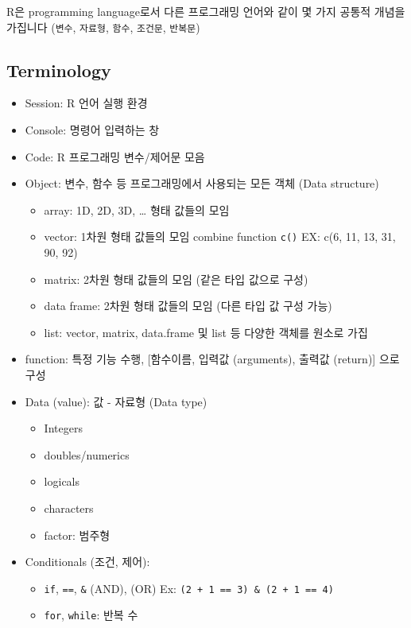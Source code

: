 \documentclass[
]{book}
\providecommand{\tightlist}{%
  \setlength{\itemsep}{0pt}\setlength{\parskip}{0pt}}
\begin{document}
R은 programming language로서 다른 프로그래밍 언어와 같이 몇 가지 공통적 개념을 가집니다 (\texttt{변수}, \texttt{자료형}, \texttt{함수}, \texttt{조건문}, \texttt{반복문})

\hypertarget{terminology}{%
\subsection{Terminology}\label{terminology}}

\begin{itemize}
\tightlist
\item
  Session: R 언어 실행 환경
\item
  Console: 명령어 입력하는 창
\item
  Code: R 프로그래밍 변수/제어문 모음
\item
  Object: 변수, 함수 등 프로그래밍에서 사용되는 모든 객체 (Data structure)

  \begin{itemize}
  \tightlist
  \item
    array: 1D, 2D, 3D, \ldots{} 형태 값들의 모임
  \item
    vector: 1차원 형태 값들의 모임 combine function \texttt{c()} EX: c(6, 11, 13, 31, 90, 92)
  \item
    matrix: 2차원 형태 값들의 모임 (같은 타입 값으로 구성)
  \item
    data frame: 2차원 형태 값들의 모임 (다른 타입 값 구성 가능)
  \item
    list: vector, matrix, data.frame 및 list 등 다양한 객체를 원소로 가집
  \end{itemize}
\item
  function: 특정 기능 수행, {[}함수이름, 입력값 (arguments), 출력값 (return){]} 으로 구성
\item
  Data (value): 값 - 자료형 (Data type)

  \begin{itemize}
  \tightlist
  \item
    Integers
  \item
    doubles/numerics
  \item
    logicals
  \item
    characters
  \item
    factor: 범주형
  \end{itemize}
\item
  Conditionals (조건, 제어):

  \begin{itemize}
  \tightlist
  \item
    \texttt{if}, \texttt{==}, \texttt{\&} (AND), \texttt{\textbar{}} (OR) Ex: \texttt{(2\ +\ 1\ ==\ 3)\ \&\ (2\ +\ 1\ ==\ 4)}
  \item
    \texttt{for}, \texttt{while}: 반복 수
  \end{itemize}
\end{itemize}
\end{document}
